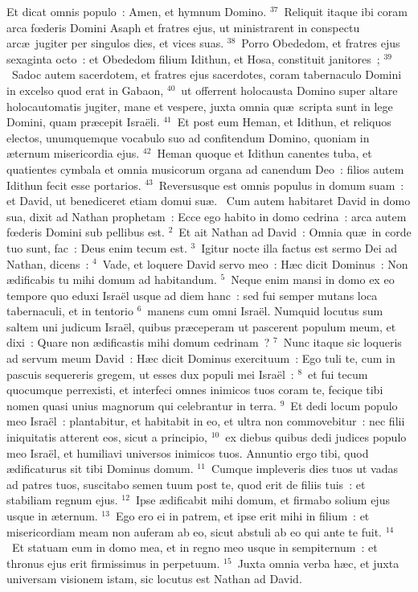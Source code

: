 Et dicat omnis populo~: Amen, et hymnum Domino.
${}^{37}$~Reliquit itaque ibi coram arca fœderis Domini Asaph et fratres ejus, ut ministrarent in conspectu arc\ae\ jugiter per singulos dies, et vices suas.
${}^{38}$~Porro Obededom, et fratres ejus sexaginta octo~: et Obededom filium Idithun, et Hosa, constituit janitores~;
${}^{39}$~Sadoc autem sacerdotem, et fratres ejus sacerdotes, coram tabernaculo Domini in excelso quod erat in Gabaon,
${}^{40}$~ut offerrent holocausta Domino super altare holocautomatis jugiter, mane et vespere, juxta omnia qu\ae\ scripta sunt in lege Domini, quam pr\ae cepit Isra\"eli.
${}^{41}$~Et post eum Heman, et Idithun, et reliquos electos, unumquemque vocabulo suo ad confitendum Domino, quoniam in \ae ternum misericordia ejus.
${}^{42}$~Heman quoque et Idithun canentes tuba, et quatientes cymbala et omnia musicorum organa ad canendum Deo~: filios autem Idithun fecit esse portarios.
${}^{43}$~Reversusque est omnis populus in domum suam~: et David, ut benediceret etiam domui su\ae .
~Cum autem habitaret David in domo sua, dixit ad Nathan prophetam~: Ecce ego habito in domo cedrina~: arca autem fœderis Domini sub pellibus est.
${}^{2}$~Et ait Nathan ad David~: Omnia qu\ae\ in corde tuo sunt, fac~: Deus enim tecum est.
${}^{3}$~Igitur nocte illa factus est sermo Dei ad Nathan, dicens~:
${}^{4}$~Vade, et loquere David servo meo~: H\ae c dicit Dominus~: Non \ae dificabis tu mihi domum ad habitandum.
${}^{5}$~Neque enim mansi in domo ex eo tempore quo eduxi Isra\"el usque ad diem hanc~: sed fui semper mutans loca tabernaculi, et in tentorio
${}^{6}$~manens cum omni Isra\"el. Numquid locutus sum saltem uni judicum Isra\"el, quibus pr\ae ceperam ut pascerent populum meum, et dixi~: Quare non \ae dificastis mihi domum cedrinam~?
${}^{7}$~Nunc itaque sic loqueris ad servum meum David~: H\ae c dicit Dominus exercituum~: Ego tuli te, cum in pascuis sequereris gregem, ut esses dux populi mei Isra\"el~:
${}^{8}$~et fui tecum quocumque perrexisti, et interfeci omnes inimicos tuos coram te, fecique tibi nomen quasi unius magnorum qui celebrantur in terra.
${}^{9}$~Et dedi locum populo meo Isra\"el~: plantabitur, et habitabit in eo, et ultra non commovebitur~: nec filii iniquitatis atterent eos, sicut a principio,
${}^{10}$~ex diebus quibus dedi judices populo meo Isra\"el, et humiliavi universos inimicos tuos. Annuntio ergo tibi, quod \ae dificaturus sit tibi Dominus domum.
${}^{11}$~Cumque impleveris dies tuos ut vadas ad patres tuos, suscitabo semen tuum post te, quod erit de filiis tuis~: et stabiliam regnum ejus.
${}^{12}$~Ipse \ae dificabit mihi domum, et firmabo solium ejus usque in \ae ternum.
${}^{13}$~Ego ero ei in patrem, et ipse erit mihi in filium~: et misericordiam meam non auferam ab eo, sicut abstuli ab eo qui ante te fuit.
${}^{14}$~Et statuam eum in domo mea, et in regno meo usque in sempiternum~: et thronus ejus erit firmissimus in perpetuum.
${}^{15}$~Juxta omnia verba h\ae c, et juxta universam visionem istam, sic locutus est Nathan ad David.


